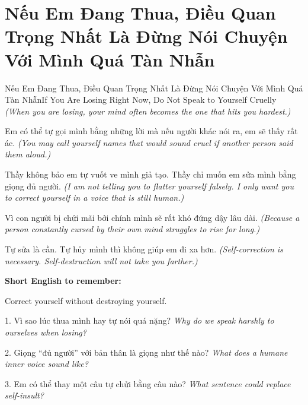 \section{Nếu Em Đang Thua, Điều Quan Trọng Nhất Là Đừng Nói Chuyện Với Mình Quá Tàn Nhẫn}
\begin{truyen}{Nếu Em Đang Thua, Điều Quan Trọng Nhất Là Đừng Nói Chuyện Với Mình Quá Tàn Nhẫn}{If You Are Losing Right Now, Do Not Speak to Yourself Cruelly}
\textit{(When you are losing, your mind often becomes the one that hits you hardest.)}

Em có thể tự gọi mình bằng những lời mà nếu người khác nói ra, em sẽ thấy rất ác.
\textit{(You may call yourself names that would sound cruel if another person said them aloud.)}

Thầy không bảo em tự vuốt ve mình giả tạo. Thầy chỉ muốn em sửa mình bằng giọng đủ người.
\textit{(I am not telling you to flatter yourself falsely. I only want you to correct yourself in a voice that is still human.)}

Vì con người bị chửi mãi bởi chính mình sẽ rất khó đứng dậy lâu dài.
\textit{(Because a person constantly cursed by their own mind struggles to rise for long.)}
\end{truyen}

\begin{baihoc}
Tự sửa là cần. Tự hủy mình thì không giúp em đi xa hơn.
\textit{(Self-correction is necessary. Self-destruction will not take you farther.)}
\end{baihoc}

\begin{ghinhoanh}
\textbf{Short English to remember:}

Correct yourself without destroying yourself.

\end{ghinhoanh}

\begin{tuhocnhanh}
1. Vì sao lúc thua mình hay tự nói quá nặng? \textit{Why do we speak harshly to ourselves when losing?}

2. Giọng “đủ người” với bản thân là giọng như thế nào? \textit{What does a humane inner voice sound like?}

3. Em có thể thay một câu tự chửi bằng câu nào? \textit{What sentence could replace self-insult?}
\end{tuhocnhanh}
\ngancach

